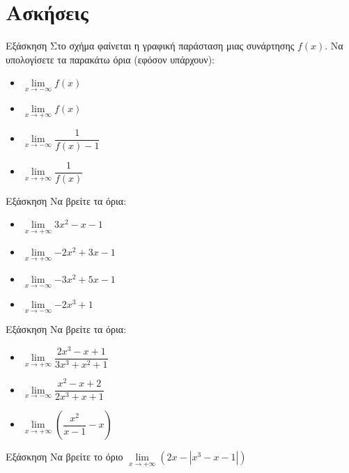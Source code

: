 \documentclass[greek]{beamer}
\begin{document}
\section{Ασκήσεις}
\begin{frame}{Εξάσκηση}
      Στο σχήμα
      \href{https://www.geogebra.org/m/p9xmedm8}{}
      φαίνεται η γραφική παράσταση μιας συνάρτησης $f(x)$. Να υπολογίσετε τα παρακάτω όρια (εφόσον υπάρχουν):
      \begin{itemize}
            \item $\lim\limits_{x \to -\infty}{ f(x) }$ \pause
            \item $\lim\limits_{x \to +\infty}{ f(x) }$ \pause
            \item $\lim\limits_{x \to -\infty}{ \dfrac{1}{f(x)-1} }$ \pause
            \item $\lim\limits_{x \to +\infty}{ \dfrac{1}{f(x)} }$
      \end{itemize}
\end{frame}

\begin{frame}{Εξάσκηση}
      Να βρείτε τα όρια:
      \begin{itemize}
            \item $\lim\limits_{x \to +\infty}{ 3x^2-x-1 }$ \pause
            \item $\lim\limits_{x \to +\infty}{ -2x^2+3x-1 }$ \pause
            \item $\lim\limits_{x \to -\infty}{ -3x^2+5x-1 }$ \pause
            \item $\lim\limits_{x \to -\infty}{ -2x^3+1 }$
      \end{itemize}
\end{frame}

\begin{frame}{Εξάσκηση}
      Να βρείτε τα όρια:
      \begin{itemize}
            \item $\lim\limits_{x \to +\infty}{ \dfrac{2x^3-x+1}{3x^3+x^2+1} }$ \pause
            \item $\lim\limits_{x \to -\infty}{ \dfrac{x^2-x+2}{2x^3+x+1} }$ \pause
            \item $\lim\limits_{x \to +\infty}{ \left( \dfrac{x^2}{x-1}-x  \right)  }$
      \end{itemize}
\end{frame}

\begin{frame}{Εξάσκηση}
      Να βρείτε το όριο $\lim\limits_{x \to +\infty}{ \left( 2x-|x^3-x-1| \right)  }$
\end{frame}
\end{document}
